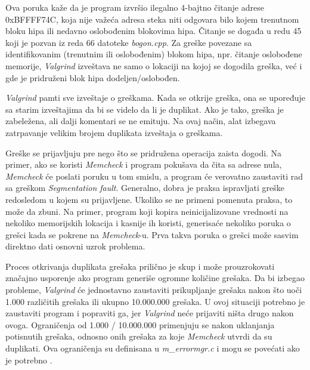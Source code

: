 \documentclass[12pt,oneside]{memoir}
\theoremstyle{plain}
\theoremstyle{definition}
\begin{document}
Ova poruka kaže da je program izvršio ilegalno 4-bajtno čitanje adrese 0xBFFFF74C, koja nije važeća adresa steka niti odgovara bilo kojem trenutnom bloku hipa ili nedavno oslobođenim blokovima hipa. Čitanje se događa u redu 45 koji je pozvan iz reda 66 datoteke \textit{bogon.cpp}. Za greške povezane sa identifikovanim (trenutnim ili oslobođenim) blokom hipa, npr. čitanje oslobođene memorije, \textit{Valgrind} izveštava ne samo o lokaciji na kojoj se dogodila greška, već i gde je pridruženi blok hipa dodeljen/oslobođen.

\textit{Valgrind} pamti sve izveštaje o greškama. Kada se otkrije greška, ona se upoređuje sa starim izveštajima da bi se videlo da li je duplikat. Ako je tako, greška je zabeležena, ali dalji komentari se ne emituju. Na ovaj način, alat izbegava zatrpavanje velikim brojem duplikata izveštaja o greškama.  

Greške se prijavljuju pre nego što se pridružena operacija zaista dogodi. Na primer, ako se koristi \textit{Memcheck} i program pokušava da čita sa adrese nula, \textit{Memcheck} će poslati poruku u tom smislu, a program će verovatno zaustaviti rad sa greškom \textit{Segmentation fault}. Generalno, dobra je praksa ispravljati greške redosledom u kojem su prijavljene. Ukoliko se ne primeni pomenuta praksa, to može da zbuni. Na primer, program koji kopira neinicijalizovane vrednosti na nekoliko memorijskih lokacija i kasnije ih koristi, generisaće nekoliko poruka o grešci kada se pokrene na \textit{Memcheck}-u. Prva takva poruka o grešci može sasvim direktno dati osnovni uzrok problema. 

Proces otkrivanja duplikata grešaka prilično je skup i može prouzrokovati značajno usporenje ako program generiše ogromne količine grešaka. Da bi izbegao probleme, \textit{Valgrind} će jednostavno zaustaviti prikupljanje grešaka nakon što uoči 1.000 različitih grešaka ili ukupno 10.000.000 grešaka. U ovoj situaciji potrebno je zaustaviti program i popraviti ga, jer \textit{Valgrind} neće prijaviti ništa drugo nakon ovoga. Ograničenja od 1.000 / 10.000.000 primenjuju se nakon uklanjanja potisnutih grešaka, odnosno onih grešaka za koje \textit{Memcheck} utvrdi da su duplikati. Ova ograničenja su definisana u \textit{m\_errormgr.c} i mogu se povećati ako je potrebno \cite{ValgrindCore}. 
\end{document}
